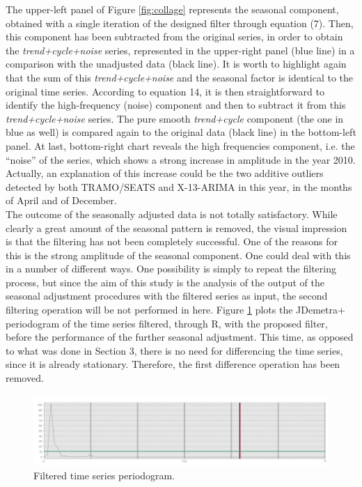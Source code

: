 \documentclass[english,blauw]{cbsdiscussionpaper}
\begin{document}
The upper-left panel of Figure \ref{fig:collage} represents the seasonal component, obtained with a single iteration of the designed filter through equation (7). Then, this component has been subtracted from the original series, in order to obtain the \textit{trend+cycle+noise} series, represented in the upper-right panel (blue line) in a comparison with the unadjusted data (black line). It is worth to highlight again that the sum of this \textit{trend+cycle+noise} and the seasonal factor is identical to the original time series. According to equation 14, it is then straightforward to identify the high-frequency (noise) component and then to subtract it from this \textit{trend+cycle+noise} series. The pure smooth \textit{trend+cycle} component (the one in blue as well) is compared again to the original data (black line) in the bottom-left panel. At last, bottom-right chart reveals the high frequencies component, i.e. the ``noise'' of the series, which shows a strong increase in amplitude in the year 2010. Actually, an explanation of this increase could be the two additive outliers detected by both TRAMO/SEATS and X-13-ARIMA in this year, in the months of April and of December.\\The outcome of the seasonally adjusted data is not totally satisfactory. While clearly a great amount of the seasonal pattern is removed, the visual impression is that the filtering has not been completely successful. One of the reasons for this is the strong amplitude of the seasonal component. One could deal with this in a number of different ways. One possibility is simply to repeat the filtering process, but since the aim of this study is the analysis of the output of the seasonal adjustment procedures with the filtered series as input, the second filtering operation will be not performed in here. Figure \ref{fig:tc_periodogram} plots the JDemetra+ periodogram of the time series filtered, through R, with the proposed filter, before the performance of the further seasonal adjustment. This time, as opposed to what was done in Section 3, there is no need for differencing the time series, since it is already stationary. Therefore, the first difference operation has been removed.\\ 
\begin{figure}[h]
\includegraphics[width=\linewidth]{../images/capitolo4/tc_periodogram.jpg}
\caption{Filtered time series periodogram.}
\label{fig:tc_periodogram}
\end{figure}
\end{document}
